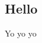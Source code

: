 \documentclass[../Main.tex]{subfiles}
\begin{document}
    \subsection{Hello}
        Yo yo yo
\end{document}
